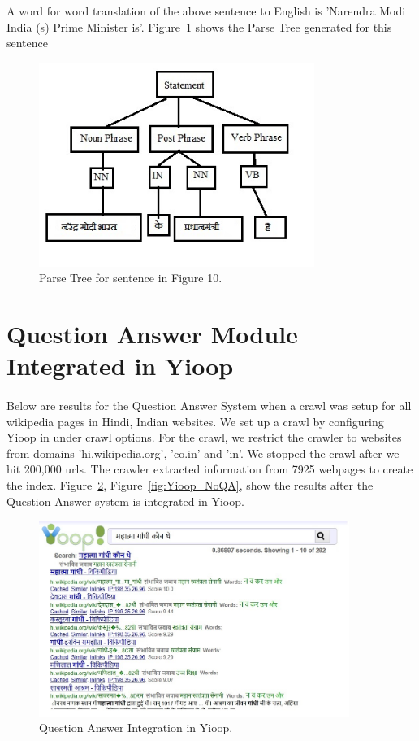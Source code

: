 A word for word translation of the above sentence to English is 'Narendra Modi India (s) Prime Minister is'. Figure~\ref{fig:standalone_testcase2} shows the Parse Tree generated for this sentence 

\begin{figure}[htb]
\centering
\includegraphics[width=0.8\textwidth]{images/standalone_testcase2.jpg}
\caption{Parse Tree for sentence in Figure 10.} 
\label{fig:standalone_testcase2}
\end{figure}

\break
\section{Question Answer Module Integrated in Yioop}
\paragraph{}
Below are results for the Question Answer System when a crawl was setup for all wikipedia pages in Hindi, Indian websites. We set up a crawl by configuring Yioop in under crawl options. For the crawl, we restrict the crawler to websites from domains 'hi.wikipedia.org', 'co.in' and 'in'. We stopped the crawl  after we hit 200,000 urls. The crawler extracted information from 7925 webpages to create the index. Figure~\ref{fig:QA_IntegratedInYioop},  Figure~\ref{fig:Yioop_NoQA}, show the results after the Question Answer system is integrated in Yioop. 

\begin{figure}[htb]
\centering
\includegraphics[width=0.9\textwidth]{images/QA_IntegratedInYioop.jpg}
\caption{Question Answer Integration in Yioop.} 
\label{fig:QA_IntegratedInYioop}
\end{figure}
\break

